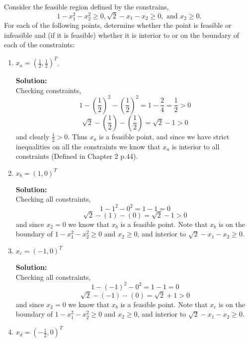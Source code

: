 \documentclass[12pt]{article}
\makeatletter
\theoremstyle{homework}
\newenvironment{exercise}[1]
{\def\@currentlabel{#1}\exercisecore}
{\endexercisecore}
\newcommand{\localhead}[1]{\par\smallskip\noindent\textbf{#1}\nobreak\\}%
\newcommand\solution{\localhead{Solution:}}
\makeatother
\begin{document}
\begin{exercise}{2.1} Consider the feasible region defined by the constrains, 
  \begin{equation*}
    1 - x_1^2 - x_2^2 \geq 0, \sqrt{2} - x_1 - x_2 \geq 0,\text{ and } x_2 \geq 0. 
  \end{equation*}
  For each of the following points, determine whether the point is feasible or infeasible and (if it is feasible)
  whether it is interior to or on the boundary of each of the constraints:
  \begin{enumerate}
    \item $x_a = (\frac{1}{2}, \frac{1}{2})^{T}$.
    \solution Checking constraints, 
    \begin{equation*}
      1 - \left(\frac{1}{2}\right)^2 - \left(\frac{1}{2}\right)^2 = 1 - \frac{2}{4} = \frac{1}{2} > 0
    \end{equation*}
    \begin{equation*}
      \sqrt{2} - (\frac{1}{2}) - (\frac{1}{2}) = \sqrt{2} - 1 > 0
    \end{equation*}
    and clearly $\frac{1}{2} > 0$. Thus $x_a$ is a feasible point, and since we have strict inequalities
    on all the constraints we know that $x_a$ is interior to all constraints (Defined in Chapter 2 p.44). 
    
    \item $x_b = (1,0)^T$
    \solution Checking all constraints, 
    \begin{equation*}
      1 - 1^2 - 0^2 = 1 - 1 =  0
    \end{equation*}
    \begin{equation*}
      \sqrt{2} - (1) - (0) = \sqrt{2} - 1 > 0
    \end{equation*}
    and since $x_2 = 0$ we know that $x_b$ is a feasible point. Note that $x_b$ is on the boundary of 
    $1 - x_1^2 - x_2^2 \geq 0$ and $x_2 \geq 0$, and interior to $\sqrt{2} - x_1 - x_2 \geq 0$.


    \item $x_c = (-1, 0)^T$
    \solution Checking all constraints, 
    \begin{equation*}
      1 - (-1)^2 - 0^2 = 1 - 1 =  0
    \end{equation*}
    \begin{equation*}
      \sqrt{2} - (-1) - (0) = \sqrt{2} + 1 > 0
    \end{equation*}
    and since $x_2 = 0$ we know that $x_b$ is a feasible point. Note that $x_c$ is on the boundary of 
    $1 - x_1^2 - x_2^2 \geq 0$ and $x_2 \geq 0$, and interior to $\sqrt{2} - x_1 - x_2 \geq 0$.

    \item $x_d = (-\frac{1}{2}, 0)^T$ 

  \end{enumerate}


\end{exercise}
\vspace{1in}
\end{document}
